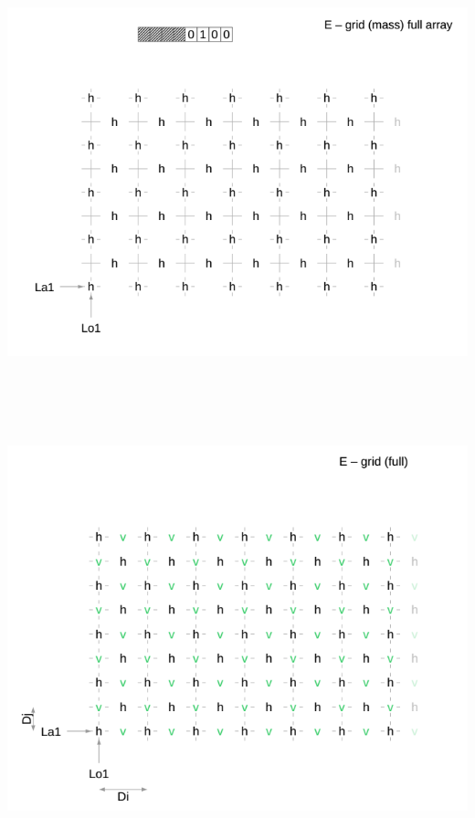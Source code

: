 {}\includegraphics[width=6.49931in,height=4.92361in]{../tex/extracted-media/media/image9.png}\includegraphics[width=6.49931in,height=5.15972in]{../tex/extracted-media/media/image10.png}\textbf{\\
}
